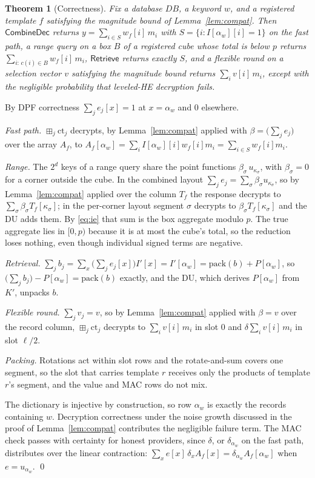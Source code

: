 \documentclass[a4paper,fleqn]{cas-sc}
\newtheorem{theorem}{Theorem}
\newcommand{\bplus}{\boxplus}
\begin{document}
\begin{theorem}[Correctness]
\label{thm:correct}
Fix a database $DB$, a keyword $w$, and a registered template $f$ satisfying
the magnitude bound of Lemma~\ref{lem:compat}. Then $\mathsf{CombineDec}$
returns $y=\sum_{i\in S} w_f[i]\,m_i$ with $S=\{i: I[\alpha_w][i]=1\}$ on the
fast path, a range query on a box $B$ of a registered cube whose total is
below $p$ returns $\sum_{i:\,c(i)\in B}w_f[i]\,m_i$, $\mathsf{Retrieve}$
returns exactly $S$, and a flexible round on a selection vector $v$ satisfying
the magnitude bound returns $\sum_i v[i]\,m_i$, except with the negligible
probability that leveled-HE decryption fails.
\end{theorem}
\begin{pf}
By DPF correctness $\sum_j e_j[x]=1$ at $x=\alpha_w$ and $0$ elsewhere.

\emph{Fast path.} $\bplus_j\text{ct}_j$ decrypts, by Lemma~\ref{lem:compat}
applied with $\beta=\big(\sum_j e_j\big)$ over the array $A_f$, to
$A_f[\alpha_w]=\sum_i I[\alpha_w][i]w_f[i]m_i=\sum_{i\in S}w_f[i]m_i$.

\emph{Range.} The $2^d$ keys of a range query share the point functions
$\beta_\sigma\,u_{\kappa_\sigma}$, with $\beta_\sigma=0$ for a corner outside
the cube. In the combined layout $\sum_j e_j=\sum_\sigma\beta_\sigma
u_{\kappa_\sigma}$, so by Lemma~\ref{lem:compat} applied over the column $T_f$
the response decrypts to $\sum_\sigma\beta_\sigma T_f[\kappa_\sigma]$; in the
per-corner layout segment $\sigma$ decrypts to $\beta_\sigma
T_f[\kappa_\sigma]$ and the DU adds them. By \eqref{eq:ie} that sum is the box
aggregate modulo $p$. The true aggregate lies in $[0,p)$ because it is at most
the cube's total, so the reduction loses nothing, even though individual signed
terms are negative.

\emph{Retrieval.} $\sum_j b_j=\sum_x\big(\sum_j e_j[x]\big)
I'[x]=I'[\alpha_w]=\mathrm{pack}(b)+P[\alpha_w]$, so $\big(\sum_j
b_j\big)-P[\alpha_w]=\mathrm{pack}(b)$ exactly, and the DU, which derives
$P[\alpha_w]$ from $K'$, unpacks $b$.

\emph{Flexible round.} $\sum_j v_j=v$, so by Lemma~\ref{lem:compat} applied
with $\beta=v$ over the record column, $\bplus_j\text{ct}_j$ decrypts to
$\sum_i v[i]\,m_i$ in slot $0$ and $\delta\sum_i v[i]\,m_i$ in slot $\ell/2$.

\emph{Packing.} Rotations act within slot rows and the rotate-and-sum covers
one segment, so the slot that carries template $r$ receives only the products
of template $r$'s segment, and the value and MAC rows do not mix.

The dictionary is injective by construction, so row $\alpha_w$ is exactly the
records containing $w$. Decryption correctness under the noise growth
discussed in the proof of Lemma~\ref{lem:compat} contributes the negligible
failure term. The MAC check passes with certainty for honest providers, since
$\delta$, or $\delta_{\alpha_w}$ on the fast path, distributes over the linear
contraction: $\sum_x e[x]\,\delta_xA_f[x]=\delta_{\alpha_w}A_f[\alpha_w]$ when
$e=u_{\alpha_w}$. \qed
\end{pf}
\end{document}

